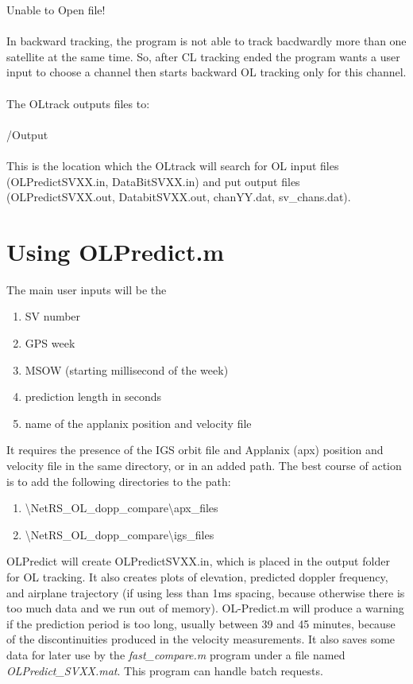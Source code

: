 \documentclass[12pt,letterpaper,oneside]{report}
\begin{document}
{\selectfont Unable to Open file!}\\\\
In backward tracking, the program is not able to track bacdwardly more than one satellite at the same time. So, after CL tracking ended the program wants a user input to choose a channel then starts backward OL tracking only for this channel.\\\\
The OLtrack outputs files to:\\\\
{\indent\indent}/Output\\\\
This is the location which the OLtrack will search for OL input files (OLPredictSVXX.in, DataBitSVXX.in) and put output files (OLPredictSVXX.out, DatabitSVXX.out, chanYY.dat, sv\_chans.dat).

\section{Using OLPredict.m}
The main user inputs will be the
\begin{enumerate}
\item SV number
\item GPS week
\item MSOW (starting millisecond of the week)
\item prediction length in seconds
\item name of the applanix position and velocity file
\end{enumerate}
{\indent\indent}It requires the presence of the IGS orbit file and Applanix (apx) position and velocity file in the same directory, or in an added path. The best course of action is to add the following directories to the path:\\
\begin{enumerate}
\item \textbackslash NetRS\_OL\_dopp\_compare\textbackslash apx\_files
\item \textbackslash NetRS\_OL\_dopp\_compare\textbackslash igs\_files
\end{enumerate}

OLPredict will create OLPredictSVXX.in, which is placed in the output folder for OL tracking. It also creates plots of elevation, predicted doppler frequency, and airplane trajectory (if using less than 1ms spacing, because otherwise there is too much data and we run out of memory). OL-Predict.m will produce a warning if the prediction period is too long, usually between 39 and 45 minutes, because of the discontinuities produced in the velocity measurements. It also saves some data for later use by the \emph{fast\_compare.m} program under a file named \emph{OLPredict\_SVXX.mat}. This program can handle batch requests.
\end{document}
